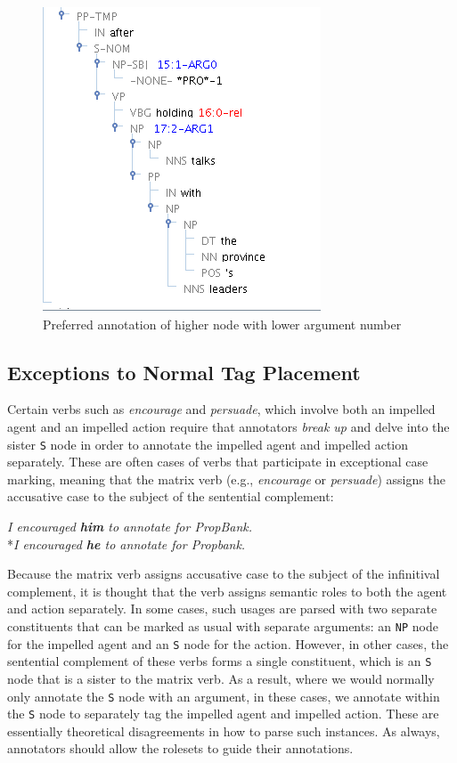 \documentclass[11pt]{report}
\begin{document}
\begin{figure}[htbp]
\centering
\includegraphics[scale=0.4]{img/ArgPlacement.png}
\caption{Preferred annotation of higher node with lower argument number}
\label{fig: ArgPlacement}
\end{figure}

\subsection{Exceptions to Normal Tag Placement}
Certain verbs such as \textit{encourage} and \textit{persuade}, which involve both an impelled agent and an impelled action require that annotators \textit{break up} and delve into the sister \texttt{S} node in order to annotate the impelled agent and impelled action separately.  These are often cases of verbs that participate in exceptional case marking, meaning that the matrix verb (e.g., \textit{encourage} or \textit{persuade}) assigns the accusative case to the subject of the sentential complement: 

\textit{I encouraged \textbf{him} to annotate for PropBank.} \\
\**\textit{I encouraged \textbf{he} to annotate for Propbank.} 

Because the matrix verb assigns accusative case to the subject of the infinitival complement,  it is thought that the verb assigns semantic roles to both the agent and action separately.  In some cases, such usages are parsed with two separate constituents that can be marked as usual with separate arguments: an \texttt{NP} node for the impelled agent and an \texttt{S} node for the action.  However, in  other cases, the sentential complement of these verbs forms a single constituent, which is an \texttt{S} node that is a sister to the matrix verb.  As a result, where we would normally only annotate the \texttt{S} node with an argument, in these cases, we annotate within the \texttt{S} node to separately tag the impelled agent and impelled action.  These are essentially theoretical disagreements in how to parse such instances.  As always, annotators should allow the rolesets to guide their annotations.  
\end{document}
